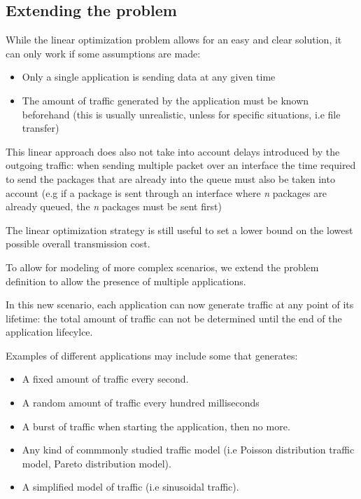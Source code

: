	
	
	\subsection{Extending the problem}
	While the linear optimization problem allows for an easy and clear solution, it can only work if some assumptions are made:
	
	\begin{itemize}
		\item Only a single application is sending data at any given time
		\item The amount of traffic generated by the application must be known beforehand (this is usually unrealistic, unless for specific situations, i.e file transfer)
	\end{itemize}
	
	This linear approach does also not take into account delays introduced by the outgoing traffic: when sending multiple packet over an interface the time required to send the packages that are already into the queue must also be taken into account (e.g if  a package is sent through an interface where \textit{n} packages are already queued, the \textit{n} packages must be sent first)
	
	The linear optimization strategy is still useful to set a lower bound on the lowest possible overall transmission cost.
	
	To allow for modeling of more complex scenarios, we extend the problem definition to allow the presence of multiple applications.
	
	In this new scenario, each application can now generate traffic at any point of its lifetime: the total amount of traffic can not be determined until the end of the application lifecylce.
	
	Examples of different applications may include some that generates:
	\begin{itemize}
		\item A fixed amount of traffic every second.
		\item A random amount of traffic every hundred milliseconds
		\item A burst of traffic when starting the application, then no more.
		\item Any kind of commmonly studied traffic model (i.e Poisson distribution traffic model, Pareto distribution model).
		\item A simplified model of traffic (i.e sinusoidal traffic).
	\end{itemize}


